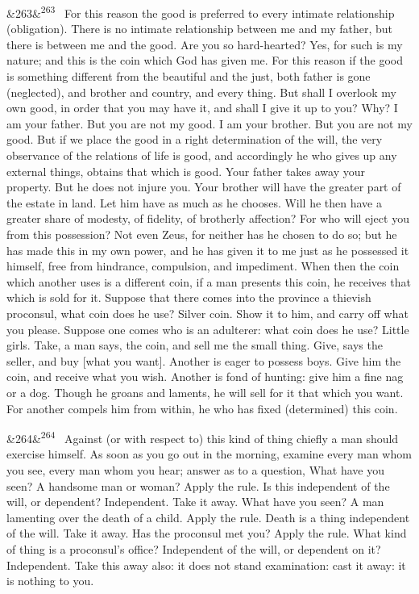 \documentclass[12pt]{article}
\newcommand{\para}[1][]{\par\noindent\ifx&#1&\else\textsuperscript{\footnotesize #1}~\fi}
\begin{document}
\para[263] For this reason the good is preferred to every intimate relationship (obligation). There is no intimate relationship between me and my father, but there is between me and the good. Are you so hard-hearted? Yes, for such is my nature; and this is the coin which God has given me. For this reason if the good is something different from the beautiful and the just, both father is gone (neglected), and brother and country, and every thing. But shall I overlook my own good, in order that you may have it, and shall I give it up to you? Why? I am your father. But you are not my good. I am your brother. But you are not my good. But if we place the good in a right determination of the will, the very observance of the relations of life is good, and accordingly he who gives up any external things, obtains that which is good. Your father takes away your property. But he does not injure you. Your brother will have the greater part of the estate in land. Let him have as much as he chooses. Will he then have a greater share of modesty, of fidelity, of brotherly affection? For who will eject you from this possession? Not even Zeus, for neither has he chosen to do so; but he has made this in my own power, and he has given it to me just as he possessed it himself, free from hindrance, compulsion, and impediment. When then the coin which another uses is a different coin, if a man presents this coin, he receives that which is sold for it. Suppose that there comes into the province a thievish proconsul, what coin does he use? Silver coin. Show it to him, and carry off what you please. Suppose one comes who is an adulterer: what coin does he use? Little girls. Take, a man says, the coin, and sell me the small thing. Give, says the seller, and buy [what you want]. Another is eager to possess boys. Give him the coin, and receive what you wish. Another is fond of hunting: give him a fine nag or a dog. Though he groans and laments, he will sell for it that which you want. For another compels him from within, he who has fixed (determined) this coin.

\para[264] Against (or with respect to) this kind of thing chiefly a man should exercise himself. As soon as you go out in the morning, examine every man whom you see, every man whom you hear; answer as to a question, What have you seen? A handsome man or woman? Apply the rule. Is this independent of the will, or dependent? Independent. Take it away. What have you seen? A man lamenting over the death of a child. Apply the rule. Death is a thing independent of the will. Take it away. Has the proconsul met you? Apply the rule. What kind of thing is a proconsul's office? Independent of the will, or dependent on it? Independent. Take this away also: it does not stand examination: cast it away: it is nothing to you.
\end{document}
